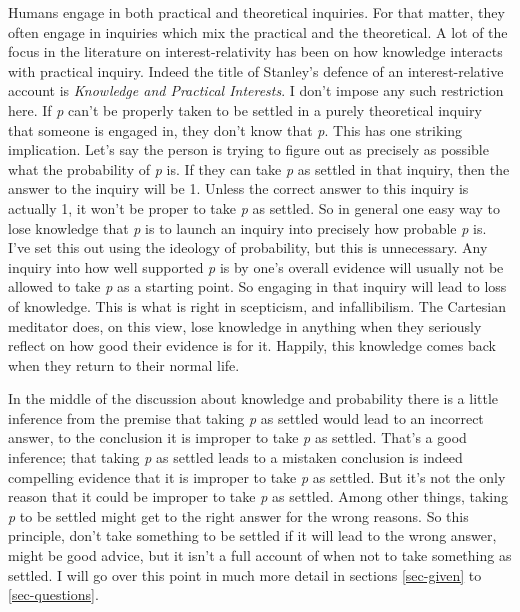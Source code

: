 \documentclass[
  10pt,
  letterpaper,
  twoside]{scrbook}
\begin{document}
Humans engage in both practical and theoretical inquiries. For that
matter, they often engage in inquiries which mix the practical and the
theoretical. A lot of the focus in the literature on interest-relativity
has been on how knowledge interacts with practical inquiry. Indeed the
title of Stanley's defence of an interest-relative account is
\emph{Knowledge and Practical Interests}. I don't impose any such
restriction here. If \emph{p} can't be properly taken to be settled in a
purely theoretical inquiry that someone is engaged in, they don't know
that \emph{p}. This has one striking implication. Let's say the person
is trying to figure out as precisely as possible what the probability of
\emph{p} is. If they can take \emph{p} as settled in that inquiry, then
the answer to the inquiry will be 1. Unless the correct answer to this
inquiry is actually 1, it won't be proper to take \emph{p} as settled.
So in general one easy way to lose knowledge that \emph{p} is to launch
an inquiry into precisely how probable \emph{p} is. I've set this out
using the ideology of probability, but this is unnecessary. Any inquiry
into how well supported \emph{p} is by one's overall evidence will
usually not be allowed to take \emph{p} as a starting point. So engaging
in that inquiry will lead to loss of knowledge. This is what is right in
scepticism, and infallibilism. The Cartesian meditator does, on this
view, lose knowledge in anything when they seriously reflect on how good
their evidence is for it. Happily, this knowledge comes back when they
return to their normal life.

In the middle of the discussion about knowledge and probability there is
a little inference from the premise that taking \emph{p} as settled
would lead to an incorrect answer, to the conclusion it is improper to
take \emph{p} as settled. That's a good inference; that taking \emph{p}
as settled leads to a mistaken conclusion is indeed compelling evidence
that it is improper to take \emph{p} as settled. But it's not the only
reason that it could be improper to take \emph{p} as settled. Among
other things, taking \emph{p} to be settled might get to the right
answer for the wrong reasons. So this principle, don't take something to
be settled if it will lead to the wrong answer, might be good advice,
but it isn't a full account of when not to take something as settled. I
will go over this point in much more detail in sections \ref{sec-given}
to \ref{sec-questions}.
\end{document}
